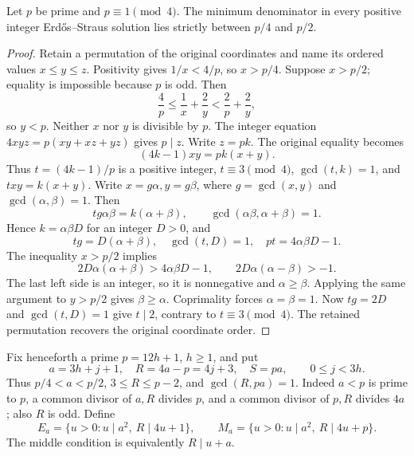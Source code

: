 \begin{theorem}\label{thm:bp-first-half}
Let \(p\) be prime and \(p\equiv1\pmod4\). The minimum denominator in
every positive integer Erd\H{o}s--Straus solution lies strictly between
\(p/4\) and \(p/2\).
\end{theorem}
\begin{proof}
Retain a permutation of the original coordinates and name its ordered
values \(x\le y\le z\). Positivity gives \(1/x<4/p\), so \(x>p/4\).
Suppose \(x>p/2\); equality is impossible because \(p\) is odd.
Then
\[
 \frac4p\le\frac1x+\frac2y<\frac2p+\frac2y,
\]
so \(y<p\). Neither \(x\) nor \(y\) is divisible by \(p\).
The integer equation \(4xyz=p(xy+xz+yz)\) gives \(p\mid z\).
Write \(z=pk\). The original equality becomes
\[
 (4k-1)xy=pk(x+y).
\]
Thus \(t=(4k-1)/p\) is a positive integer,
\(t\equiv3\pmod4\), \(\gcd(t,k)=1\), and \(txy=k(x+y)\).
Write \(x=g\alpha,y=g\beta\), where \(g=\gcd(x,y)\) and
\(\gcd(\alpha,\beta)=1\). Then
\[
 tg\alpha\beta=k(\alpha+\beta),\qquad
 \gcd(\alpha\beta,\alpha+\beta)=1.
\]
Hence \(k=\alpha\beta D\) for an integer \(D>0\), and
\[
 tg=D(\alpha+\beta),\quad \gcd(t,D)=1,\quad
 pt=4\alpha\beta D-1.
\]
The inequality \(x>p/2\) implies
\[
 2D\alpha(\alpha+\beta)>4\alpha\beta D-1,
 \qquad 2D\alpha(\alpha-\beta)>-1.
\]
The last left side is an integer, so it is nonnegative and
\(\alpha\ge\beta\). Applying the same argument to \(y>p/2\)
gives \(\beta\ge\alpha\). Coprimality forces
\(\alpha=\beta=1\). Now \(tg=2D\) and \(\gcd(t,D)=1\)
give \(t\mid2\), contrary to \(t\equiv3\pmod4\).
The retained permutation recovers the original coordinate order.
\end{proof}

Fix henceforth a prime \(p=12h+1\), \(h\ge1\), and put
\[
 a=3h+j+1,\quad R=4a-p=4j+3,\quad S=pa,
 \qquad 0\le j<3h.
\]
Thus \(p/4<a<p/2\), \(3\le R\le p-2\), and
\(\gcd(R,pa)=1\). Indeed \(a<p\) is prime to \(p\), a common
divisor of \(a,R\) divides \(p\), and a common divisor of \(p,R\)
divides \(4a\); also \(R\) is odd. Define
\[
 E_a=\{u>0:u\mid a^2,\ R\mid4u+1\},\qquad
 M_a=\{u>0:u\mid a^2,\ R\mid4u+p\}.
\]
The middle condition is equivalently \(R\mid u+a\).

